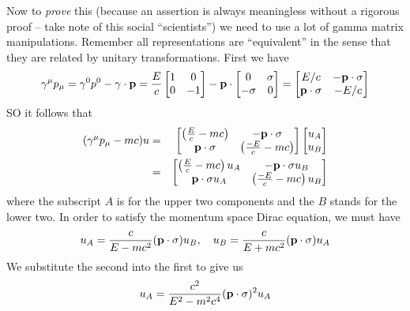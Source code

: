 Now to \emph{prove} this (because an assertion is always meaningless without a
rigorous proof -- take note of this social ``scientists'') we need to use a lot
of gamma matrix manipulations. Remember all representations are ``equivalent''
in the sense that they are related by unitary transformations. First we have
\begin{equation}
\gamma^\mu p_\mu = \gamma^0 p^0 - \bold{\gamma}\cdot\bold{p} = \frac{E}{c}\begin{bmatrix}
1 & 0 \\
0 & -1
\end{bmatrix}
- \bold{p}\cdot\begin{bmatrix}
0 & \sigma \\
-\sigma & 0 
\end{bmatrix}
=
\begin{bmatrix}
E/c & -\bold{p}\cdot\bold{\sigma} \\
\bold{p}\cdot\bold{\sigma} & -E/c
\end{bmatrix}
\end{equation}
SO it follows that
\begin{eqnarray*}
(\gamma^\mu p_\mu - mc)u &=& \begin{bmatrix}
\left(\frac{E}{c}-mc\right) & -\bold{p}\cdot\sigma \\
\bold{p}\cdot\sigma & \left(\frac{-E}{c}-mc\right)
\end{bmatrix}
\begin{bmatrix}
u_A \\
u_B
\end{bmatrix} \\
&=& \begin{bmatrix}
\left(\frac{E}{c}-mc\right)u_A & -\bold{p}\cdot\sigma u_B\\
\bold{p}\cdot\sigma u_A & \left(\frac{-E}{c}-mc\right) u_B
\end{bmatrix}
\end{eqnarray*}
where the subscript $A$ is for the upper two components and the $B$ stands for
the lower two. In order to satisfy the momentum space Dirac equation, we
must have
\begin{equation}\label{stepTowardsSolutions}
u_A = \frac{c}{E - mc^2}(\bold{p}\cdot\sigma)u_B,\quad u_B = \frac{c}{E + mc^2}(\bold{p}\cdot\sigma) u_A
\end{equation}
We substitute the second into the first to give us
\begin{equation}
u_A =\frac{c^2}{E^2 - m^2c^4}(\bold{p}\cdot\sigma)^2 u_A
\end{equation}
